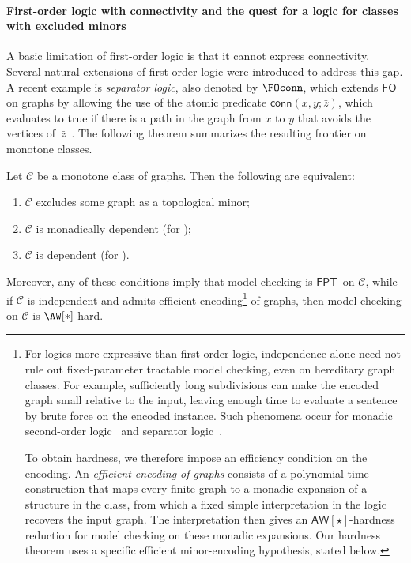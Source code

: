\documentclass[1p,number,11pt]{elsarticle}
\theoremstyle{plain}
\newcommand{\Cc}{\mathscr{C}}
\renewcommand{\FO}{\ensuremath{\mathsf{FO}}}
\renewcommand{\FPT}{\ensuremath{\mathsf{FPT}}}
\begin{document}
\newcommand{\efficientEncodingFootnote}{
For logics more expressive than first-order logic, independence alone need not rule out fixed-parameter tractable model checking, even on hereditary graph classes. 
For example, sufficiently long subdivisions can make the encoded graph small relative to the input, leaving enough time to evaluate a sentence by brute force on the encoded instance. 
Such phenomena occur for monadic second-order logic~\cite{ganian2010there,kreutzer2010lower} and separator logic~\cite{pillipczuk2021connectivity}.

To obtain hardness, we therefore impose an efficiency condition on the encoding. 
An \emph{efficient encoding of graphs} consists of a polynomial-time construction that maps every finite graph to a monadic expansion of a structure in the class, from which a fixed simple interpretation in the logic recovers the input graph. 
The interpretation then gives an $\mathsf{AW}[\star]$-hardness reduction for model checking on these monadic expansions. 
Our hardness theorem uses a specific efficient minor-encoding hypothesis, stated below.
}

\paragraph{First-order logic with connectivity and the quest for a logic for classes with excluded minors}
A basic limitation of first-order logic is that it cannot express connectivity. Several natural extensions of first-order logic were introduced to address this gap.
A recent example is \emph{separator logic}, also denoted by $\FOconn$, which extends $\FO$ on graphs by allowing the use of the atomic predicate $\mathsf{conn}(x,y;\bar z)$, which evaluates to true if there is a path in the graph from $x$ to $y$ that avoids the vertices of~$\bar z$~\cite{bojanczyk2021separator,schirrmacher2023first}.
The following theorem summarizes the resulting frontier on monotone classes. 

\begin{theorem}[
  store=thm:separator-characterization,
  restate-keys={note=restated}
]
Let $\Cc$ be a monotone class of graphs. Then the following are equivalent:
\begin{enumerate}[label=(\arabic*),nosep]
  \item $\Cc$ excludes some graph as a topological minor;
  \item $\Cc$ is monadically dependent (for \FOconn);
  \item $\Cc$ is  dependent (for \FOconn).
\end{enumerate}
\medskip

Moreover, any of these conditions imply that  {\FOconn} model checking is \FPT\ on $\Cc$, while if $\Cc$ is independent and admits efficient encoding\footnote{\efficientEncodingFootnote} of graphs, then
model checking  on $\Cc$ is $\AW[*]$-hard.
\end{theorem}
\end{document}

